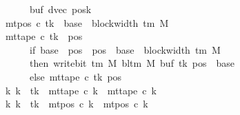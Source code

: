 \begin{isabellebody}
\ \ \ \ \ \ \ \ \ \ \ \ \ \ \ \ \ \ \ \ buf{\isacharcomma}{\kern0pt}\ dvec{\isacharcomma}{\kern0pt}\ posk{\isacharparenright}{\kern0pt}\isanewline
\ \ \ \ \ \ \ \ \ \ \ \ \ \ {\isasymand}\ mt{\isacharunderscore}{\kern0pt}pos\ c{\isacharprime}{\kern0pt}\ tk\ {\isacharequal}{\kern0pt}\ base\ {\isacharplus}{\kern0pt}\ {\isacharparenleft}{\kern0pt}block{\isacharunderscore}{\kern0pt}width\ {\isacharparenleft}{\kern0pt}{\isasymGamma}{\isacharunderscore}{\kern0pt}tm\ M{\isacharparenright}{\kern0pt}\ {\isacharminus}{\kern0pt}\ {}{\isacharparenright}{\kern0pt}\isanewline
\ \ \ \ \ \ \ \ \ \ \ \ \ \ {\isasymand}\ mt{\isacharunderscore}{\kern0pt}tape\ c{\isacharprime}{\kern0pt}\ tk\ {\isacharequal}{\kern0pt}\ {\isacharparenleft}{\kern0pt}{\isasymlambda}pos{\isachardot}{\kern0pt}\isanewline
\ \ \ \ \ \ \ \ \ \ \ \ \ \ \ \ \ \ \ \ if\ base\ {\isasymle}\ pos\ {\isasymand}\ pos\ {\isacharless}{\kern0pt}\ base\ {\isacharplus}{\kern0pt}\ {\isacharparenleft}{\kern0pt}block{\isacharunderscore}{\kern0pt}width\ {\isacharparenleft}{\kern0pt}{\isasymGamma}{\isacharunderscore}{\kern0pt}tm\ M{\isacharparenright}{\kern0pt}\ {\isacharminus}{\kern0pt}\ {}{\isacharparenright}{\kern0pt}\isanewline
\ \ \ \ \ \ \ \ \ \ \ \ \ \ \ \ \ \ \ \ then\ write{\isacharunderscore}{\kern0pt}bit\ {\isacharparenleft}{\kern0pt}{\isasymGamma}{\isacharunderscore}{\kern0pt}tm\ M{\isacharparenright}{\kern0pt}\ {\isacharparenleft}{\kern0pt}bl{\isacharunderscore}{\kern0pt}tm\ M{\isacharparenright}{\kern0pt}\ {\isacharparenleft}{\kern0pt}buf\ tk{\isacharparenright}{\kern0pt}\ {\isacharparenleft}{\kern0pt}pos\ {\isacharminus}{\kern0pt}\ base{\isacharparenright}{\kern0pt}\isanewline
\ \ \ \ \ \ \ \ \ \ \ \ \ \ \ \ \ \ \ \ else\ mt{\isacharunderscore}{\kern0pt}tape\ c{}\ tk\ pos{\isacharparenright}{\kern0pt}\isanewline
\ \ \ \ \ \ \ \ \ \ \ \ \ \ {\isasymand}\ {\isacharparenleft}{\kern0pt}{\isasymforall}k{\isacharprime}{\kern0pt}{\isachardot}{\kern0pt}\ k{\isacharprime}{\kern0pt}\ {\isasymnoteq}\ tk\ {\isasymlongrightarrow}\ mt{\isacharunderscore}{\kern0pt}tape\ c{\isacharprime}{\kern0pt}\ k{\isacharprime}{\kern0pt}\ {\isacharequal}{\kern0pt}\ mt{\isacharunderscore}{\kern0pt}tape\ c{}\ k{\isacharprime}{\kern0pt}{\isacharparenright}{\kern0pt}\isanewline
\ \ \ \ \ \ \ \ \ \ \ \ \ \ {\isasymand}\ {\isacharparenleft}{\kern0pt}{\isasymforall}k{\isacharprime}{\kern0pt}{\isachardot}{\kern0pt}\ k{\isacharprime}{\kern0pt}\ {\isasymnoteq}\ tk\ {\isasymlongrightarrow}\ mt{\isacharunderscore}{\kern0pt}pos\ c{\isacharprime}{\kern0pt}\ k{\isacharprime}{\kern0pt}\ {\isacharequal}{\kern0pt}\ mt{\isacharunderscore}{\kern0pt}pos\ c{}\ k{\isacharprime}{\kern0pt}{\isacharparenright}{\kern0pt}{\isachardoublequoteclose}\isanewline

\end{isabellebody}
